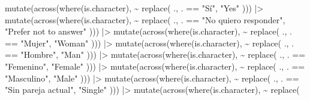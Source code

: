 \documentclass[
  bookmarksnumbered]{article}
\newenvironment{Shaded}{\begin{snugshade}}{\end{snugshade}}
\newcommand{\FunctionTok}[1]{\textcolor[rgb]{0.94,0.94,0.56}{#1}}
\newcommand{\NormalTok}[1]{\textcolor[rgb]{0.80,0.80,0.80}{#1}}
\newcommand{\SpecialCharTok}[1]{\textcolor[rgb]{0.86,0.64,0.64}{#1}}
\newcommand{\StringTok}[1]{\textcolor[rgb]{0.80,0.58,0.58}{#1}}
\begin{document}
\begin{Shaded}
\begin{Highlighting}[]
  \FunctionTok{mutate}\NormalTok{(}\FunctionTok{across}\NormalTok{(}\FunctionTok{where}\NormalTok{(is.character), }\SpecialCharTok{\textasciitilde{}} \FunctionTok{replace}\NormalTok{(}
\NormalTok{    ., . }\SpecialCharTok{==}
      \StringTok{"Sí"}\NormalTok{,}
    \StringTok{"Yes"}
\NormalTok{  ))) }\SpecialCharTok{|\textgreater{}}
  \FunctionTok{mutate}\NormalTok{(}\FunctionTok{across}\NormalTok{(}\FunctionTok{where}\NormalTok{(is.character), }\SpecialCharTok{\textasciitilde{}} \FunctionTok{replace}\NormalTok{(}
\NormalTok{    ., . }\SpecialCharTok{==}
      \StringTok{"No quiero responder"}\NormalTok{,}
    \StringTok{"Prefer not to answer"}
\NormalTok{  ))) }\SpecialCharTok{|\textgreater{}}
  \FunctionTok{mutate}\NormalTok{(}\FunctionTok{across}\NormalTok{(}\FunctionTok{where}\NormalTok{(is.character), }\SpecialCharTok{\textasciitilde{}} \FunctionTok{replace}\NormalTok{(}
\NormalTok{    ., . }\SpecialCharTok{==}
      \StringTok{"Mujer"}\NormalTok{,}
    \StringTok{"Woman"}
\NormalTok{  ))) }\SpecialCharTok{|\textgreater{}}
  \FunctionTok{mutate}\NormalTok{(}\FunctionTok{across}\NormalTok{(}\FunctionTok{where}\NormalTok{(is.character), }\SpecialCharTok{\textasciitilde{}} \FunctionTok{replace}\NormalTok{(}
\NormalTok{    ., . }\SpecialCharTok{==}
      \StringTok{"Hombre"}\NormalTok{,}
    \StringTok{"Man"}
\NormalTok{  ))) }\SpecialCharTok{|\textgreater{}}
  \FunctionTok{mutate}\NormalTok{(}\FunctionTok{across}\NormalTok{(}\FunctionTok{where}\NormalTok{(is.character), }\SpecialCharTok{\textasciitilde{}} \FunctionTok{replace}\NormalTok{(}
\NormalTok{    ., . }\SpecialCharTok{==}
      \StringTok{"Femenino"}\NormalTok{,}
    \StringTok{"Female"}
\NormalTok{  ))) }\SpecialCharTok{|\textgreater{}}
  \FunctionTok{mutate}\NormalTok{(}\FunctionTok{across}\NormalTok{(}\FunctionTok{where}\NormalTok{(is.character), }\SpecialCharTok{\textasciitilde{}} \FunctionTok{replace}\NormalTok{(}
\NormalTok{    ., . }\SpecialCharTok{==}
      \StringTok{"Masculino"}\NormalTok{,}
    \StringTok{"Male"}
\NormalTok{  ))) }\SpecialCharTok{|\textgreater{}}
  \FunctionTok{mutate}\NormalTok{(}\FunctionTok{across}\NormalTok{(}\FunctionTok{where}\NormalTok{(is.character), }\SpecialCharTok{\textasciitilde{}} \FunctionTok{replace}\NormalTok{(}
\NormalTok{    ., . }\SpecialCharTok{==}
      \StringTok{"Sin pareja actual"}\NormalTok{,}
    \StringTok{"Single"}
\NormalTok{  ))) }\SpecialCharTok{|\textgreater{}}
  \FunctionTok{mutate}\NormalTok{(}\FunctionTok{across}\NormalTok{(}\FunctionTok{where}\NormalTok{(is.character), }\SpecialCharTok{\textasciitilde{}} \FunctionTok{replace}\NormalTok{(}

\end{Highlighting}
\end{Shaded}
\end{document}
